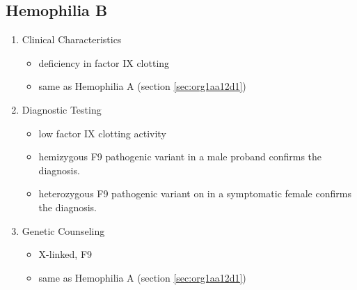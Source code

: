 \documentclass{scrartcl}
\begin{document}
\subsection{Hemophilia B}
\label{sec:org109d5b5}
\begin{enumerate}
\item Clinical Characteristics
\label{sec:orgf54e55f}
\begin{itemize}
\item deficiency in factor IX clotting
\item same as Hemophilia A (section \ref{sec:org1aa12d1})
\end{itemize}
\item Diagnostic Testing
\label{sec:orgc217404}
\begin{itemize}
\item low factor IX clotting activity
\item hemizygous F9 pathogenic variant in a male proband confirms the
diagnosis.
\item heterozygous F9 pathogenic variant on in a symptomatic female
confirms the diagnosis.
\end{itemize}
\item Genetic Counseling
\label{sec:org8a26f7d}
\begin{itemize}
\item X-linked, F9
\item same as Hemophilia A (section \ref{sec:org1aa12d1})
\end{itemize}
\end{enumerate}
\end{document}
